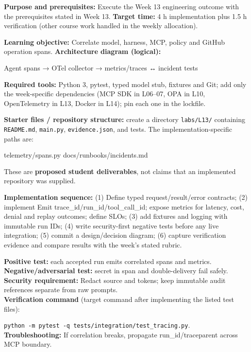 \documentclass[
  10pt,
]{article}
\newenvironment{Shaded}{\begin{snugshade}}{\end{snugshade}}
\newcommand{\NormalTok}[1]{#1}
\begin{document}
\textbf{Purpose and prerequisites:} Execute the Week 13 engineering
outcome with the prerequisites stated in Week 13. \textbf{Target time:}
4 h implementation plus 1.5 h verification (other course work handled in
the weekly allocation).

\textbf{Learning objective:} Correlate model, harness, MCP, policy and
GitHub operation spans. \textbf{Architecture diagram (logical):}

\begin{Shaded}
\begin{Highlighting}[]
\NormalTok{Agent spans → OTel collector → metrics/traces ↔}
\NormalTok{incident tests}
\end{Highlighting}
\end{Shaded}

\textbf{Required tools:} Python 3, pytest, typed model stub, fixtures
and Git; add only the week-specific dependencies (MCP SDK in L06--07,
OPA in L10, OpenTelemetry in L13, Docker in L14); pin each one in the
lockfile.

{\raggedright \textbf{Starter files / repository structure:} create a directory
\texttt{labs/\allowbreak L13/} containing \texttt{README.md}, \texttt{main.py},
\texttt{evidence.json}, and tests. The implementation-specific paths
are:\par}

\begin{Shaded}
\begin{Highlighting}[]
\NormalTok{telemetry/spans.py}
\NormalTok{docs/runbooks/incidents.md}
\end{Highlighting}
\end{Shaded}

These are \textbf{proposed student deliverables}, not claims that an
implemented repository was supplied.

{\raggedright \textbf{Implementation sequence:} (1) Define typed request/\allowbreak result/\allowbreak error
contracts; (2) implement Emit trace\_\allowbreak id/\allowbreak run\_\allowbreak id/\allowbreak tool\_\allowbreak call\_\allowbreak id; expose
metrics for latency, cost, denial and replay outcomes; define SLOs; (3)
add fixtures and logging with immutable run IDs; (4) write
security-first negative tests before any live integration; (5) commit a
design/\allowbreak decision diagram; (6) capture verification evidence and compare
results with the week's stated rubric.\par}

\textbf{Positive test:} each accepted run emits correlated spans and
metrics.\\
\textbf{Negative/adversarial test:} secret in span and double-delivery
fail safely.\\
\textbf{Security requirement:} Redact source and tokens; keep immutable
audit references separate from raw prompts.\\
\textbf{Verification command} (target command after implementing the
listed test files):\par\noindent
\texttt{python\ -m\ pytest\ -q\ tests/integration/test\_tracing.py}.\\
\textbf{Troubleshooting:} If correlation breaks, propagate
run\_id/traceparent across MCP boundary.
\end{document}
